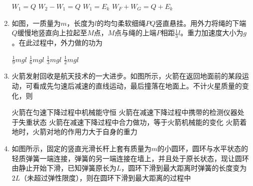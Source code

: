 \begin{enumerate}[leftmargin=0em]
\begin{minipage}[h!]{0.7\linewidth}
\vspace{0.3em}
\fourchoices
{$ W_{1} =Q $}
{$ W_{2} - W_{1} =Q $}
{$ W_{1} = E_{k} $	}
{$ W_F+W_G=Q+ E_{k} $}
\vspace{0.3em}
\end{minipage}
\hfill
\begin{minipage}[h!]{0.3\linewidth}
\flushright
\vspace{0.3em}

\vspace{0.3em}
\end{minipage}





\item
{}
如图，一质量为$ m $，长度为$ l $的均匀柔软细绳$ PQ $竖直悬挂。用外力将绳的下端$ Q $缓慢地竖直向上拉起至$ M $点，$ M $点与绳的上端$ P $相距$ \frac{ 1 }{ 3 } l $。重力加速度大小为$ g $。在此过程中，外力做的功为  
\begin{figure}[h!]
\centering

\end{figure}


\fourchoices
{$ \frac { 1 } { 9 } m g l $}
{$ \frac { 1 } { 6 } m g l $}
{$ \frac { 1 } { 3 } m g l $}
{$ \frac { 1 } { 2 } m g l $}



\item
{}
火箭发射回收是航天技术的一大进步。如图所示，火箭在返回地面前的某段运动，可看成先匀速后减速的直线运动，最后撞落在地面上。不计火星质量的变化，则  
\begin{figure}[h!]
\centering

\end{figure}

\fourchoices
{火箭在匀速下降过程中机械能守恒}
{火箭在减速下降过程中携带的检测仪器处于失重状态}
{火箭在减速下降过程中合力做功，等于火箭机械能的变化}
{火箭着地时，火箭对地的作用力大于自身的重力}




\item 
{}
如图所示，固定的竖直光滑长杆上套有质量为$ m $的小圆环，圆环与水平状态的轻质弹簧一端连接，弹簧的另一端连接在墙上，并且处于原长状态，现让圆环由静止开始下滑，已知弹簧原长为$ L $，圆环下滑到最大距离时弹簧的长度变为$ 2L $（未超过弹性限度），则在圆环下滑到最大距离的过程中  
\begin{figure}[h!]
\centering

\end{figure}



\end{enumerate}
